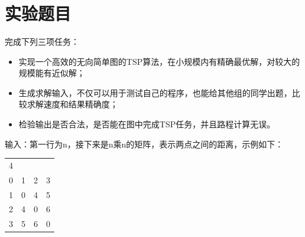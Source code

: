 \documentclass[10pt,letterpaper]{ctexart}
\begin{document}
\pagestyle{plain}
\title{
    \begin{center}
        \phantom{Start!}
    	  \vspace{2cm}
    \end{center}
}
\maketitle

\begin{center}
    \setlength{\baselineskip}{40pt}
    \vspace{1cm}
\end{center}
\pagebreak

\section{实验题目}
完成下列三项任务：
\begin{itemize}[itemindent=2em]
  \item 实现一个高效的无向简单图的TSP算法，在小规模内有精确最优解，对较大的规模能有近似解；
  \item 生成求解输入，不仅可以用于测试自己的程序，也能给其他组的同学出题，比较求解速度和结果精确度；
  \item 检验输出是否合法，是否能在图中完成TSP任务，并且路程计算无误。
\end{itemize}
\par 输入：第一行为n，接下来是n乘n的矩阵，表示两点之间的距离，示例如下：
\begin{table}[!htbp]
  \centering
  \begin{tabular}{cccc}
    4&&&\\
    0 &1& 2& 3\\
    1 &0 &4 &5\\
    2 &4 &0 &6\\
    3 &5 &6 &0\\
  \end{tabular}
\end{table}
\end{document}
